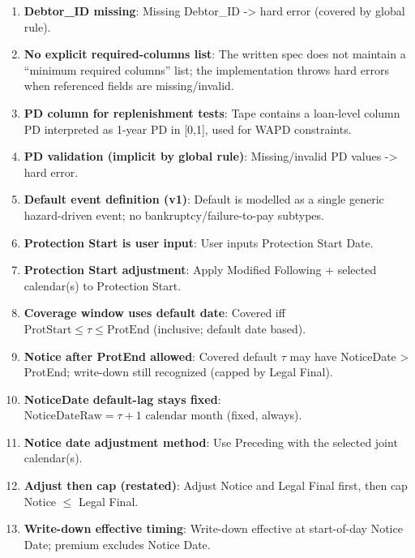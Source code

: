 \documentclass[11pt]{article}
\begin{document}
\begin{enumerate}[label=\arabic*),leftmargin=*,align=left]
\item \textbf{Debtor\_ID missing}: Missing Debtor\_ID -> hard error (covered by global rule).

\item \textbf{No explicit required-columns list}: The written spec does not maintain a “minimum required columns” list; the implementation throws hard errors when referenced fields are missing/invalid.

\item \textbf{PD column for replenishment tests}: Tape contains a loan-level column PD interpreted as 1-year PD in [0,1], used for WAPD constraints.

\item \textbf{PD validation (implicit by global rule)}: Missing/invalid PD values -> hard error.

\item \textbf{Default event definition (v1)}: Default is modelled as a single generic hazard-driven event; no bankruptcy/failure-to-pay subtypes.

\item \textbf{Protection Start is user input}: User inputs Protection Start Date.

\item \textbf{Protection Start adjustment}: Apply Modified Following + selected calendar(s) to Protection Start.

\item \textbf{Coverage window uses default date}: Covered iff $\text{ProtStart} \le \tau \le \text{ProtEnd}$ (inclusive; default date based).

\item \textbf{Notice after ProtEnd allowed}: Covered default $\tau$ may have NoticeDate > ProtEnd; write-down still recognized (capped by Legal Final).

\item \textbf{NoticeDate default-lag stays fixed}: $\text{NoticeDateRaw} = \tau + 1 \text{ calendar month}$ (fixed, always).

\item \textbf{Notice date adjustment method}: Use Preceding with the selected joint calendar(s).

\item \textbf{Adjust then cap (restated)}: Adjust Notice and Legal Final first, then cap Notice $\le$ Legal Final.

\item \textbf{Write-down effective timing}: Write-down effective at start-of-day Notice Date; premium excludes Notice Date.


\end{enumerate}
\end{document}
